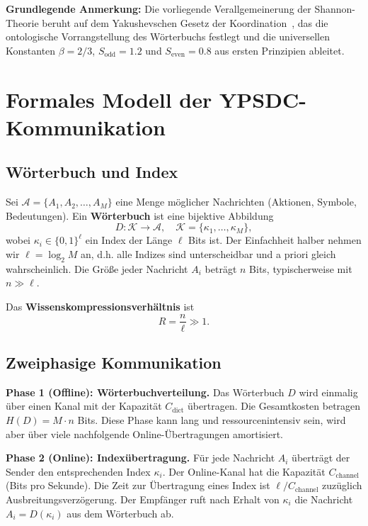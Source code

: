 \documentclass[12pt,a4paper]{article}
\theoremstyle{remark}
\begin{document}
	\textbf{Grundlegende Anmerkung:} Die vorliegende Verallgemeinerung der Shannon-Theorie beruht auf dem Yakushevschen Gesetz der Koordination~\cite{YakushevLaw2026}, das die ontologische Vorrangstellung des Wörterbuchs festlegt und die universellen Konstanten \(\beta = 2/3\), \(S_{\mathrm{odd}} = 1.2\) und \(S_{\mathrm{even}} = 0.8\) aus ersten Prinzipien ableitet.
	
	\section{Formales Modell der YPSDC-Kommunikation}
	\label{sec:model}
	
	\subsection{Wörterbuch und Index}
	
	Sei $\mathcal{A} = \{A_1, A_2, \dots, A_M\}$ eine Menge möglicher Nachrichten (Aktionen, Symbole, Bedeutungen). Ein \textbf{Wörterbuch} ist eine bijektive Abbildung
	\begin{equation}
		D: \mathcal{K} \to \mathcal{A}, \quad \mathcal{K} = \{\kappa_1, \dots, \kappa_M\},
	\end{equation}
	wobei $\kappa_i \in \{0,1\}^\ell$ ein Index der Länge $\ell$ Bits ist. Der Einfachheit halber nehmen wir $\ell = \log_2 M$ an, d.h. alle Indizes sind unterscheidbar und a priori gleich wahrscheinlich. Die Größe jeder Nachricht $A_i$ beträgt $n$ Bits, typischerweise mit $n \gg \ell$.
	
	Das \textbf{Wissenskompressionsverhältnis} ist
	\begin{equation}
		R = \frac{n}{\ell} \gg 1.
	\end{equation}
	
	\subsection{Zweiphasige Kommunikation}
	
	\textbf{Phase 1 (Offline): Wörterbuchverteilung.} Das Wörterbuch $D$ wird einmalig über einen Kanal mit der Kapazität $C_{\text{dict}}$ übertragen. Die Gesamtkosten betragen $H(D) = M \cdot n$ Bits. Diese Phase kann lang und ressourcenintensiv sein, wird aber über viele nachfolgende Online-Übertragungen amortisiert.
	
	\textbf{Phase 2 (Online): Indexübertragung.} Für jede Nachricht $A_i$ überträgt der Sender den entsprechenden Index $\kappa_i$. Der Online-Kanal hat die Kapazität $C_{\text{channel}}$ (Bits pro Sekunde). Die Zeit zur Übertragung eines Index ist $\ell / C_{\text{channel}}$ zuzüglich Ausbreitungsverzögerung. Der Empfänger ruft nach Erhalt von $\kappa_i$ die Nachricht $A_i = D(\kappa_i)$ aus dem Wörterbuch ab.
	
\end{document}

